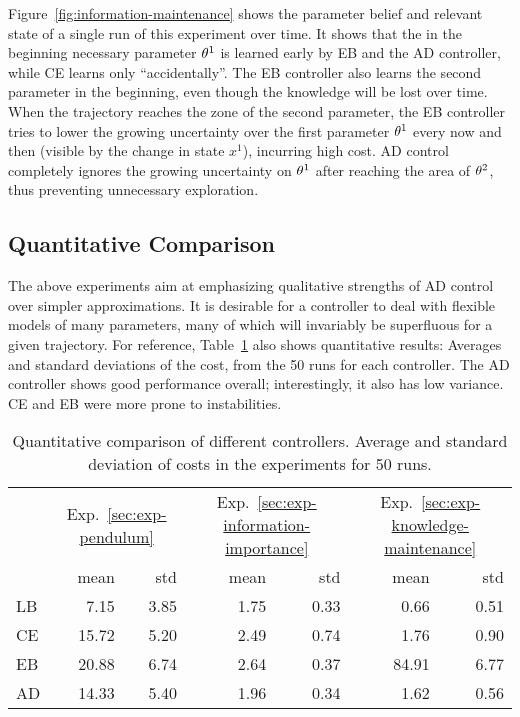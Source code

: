 Figure~\ref{fig:information-maintenance} shows the parameter belief and relevant
state of a single run of this experiment over time. It shows that the in
the beginning necessary parameter $\theta^1$ is learned early by EB and the AD
controller, while CE learns only ``accidentally''. The EB controller also
learns the second parameter in the beginning, even though the knowledge will be
lost over time. When the trajectory reaches the zone of the second parameter,
the EB controller tries to lower the growing uncertainty over the first
parameter $\theta^1$ every now and then (visible by the change in state $x^1$),
incurring high cost. AD control completely ignores the growing uncertainty on
$\theta^1$ after reaching the area of $\theta^2$, thus preventing unnecessary
exploration.

\subsection{Quantitative Comparison}

The above experiments aim at emphasizing qualitative strengths of AD control
over simpler approximations. It is desirable for a controller to deal
with flexible models of many parameters, many of which will invariably
be superfluous for a given trajectory. For reference,
Table~\ref{tab:ndc-results} also shows quantitative results: Averages and
standard deviations of the cost, from the 50 runs for each controller. The AD
controller shows good performance overall; interestingly, it also has low
variance. CE and EB were more prone to instabilities.

\begin{table}
\begin{centering}\small
\begin{tabular}{@{} l | r r | r r | r r @{}}
\toprule &
\multicolumn{2}{c|}{Exp.~\ref{sec:exp-pendulum}} &
\multicolumn{2}{c|}{Exp.~\ref{sec:exp-information-importance}} &
\multicolumn{2}{c}{Exp.~\ref{sec:exp-knowledge-maintenance}}
\\       & mean&std  &  mean&std  &  mean&std \\
\midrule
LB   & 7.15&3.85 &  1.75&0.33 &  0.66&0.51 \\
CE       & 15.72&5.20 & 2.49&0.74 &  1.76&0.90 \\
EB   & 20.88&6.74 & 2.64&0.37 & 84.91&6.77 \\
AD       & 14.33&5.40 & 1.96&0.34 &  1.62&0.56 \\
\bottomrule
\end{tabular}\\
\caption[Quantitative comparison of different controllers.]{Quantitative
comparison of different controllers. Average and standard deviation of costs in
the experiments for 50 runs.}
\end{centering}
\label{tab:ndc-results}
\vspace{1mm}
\end{table}

